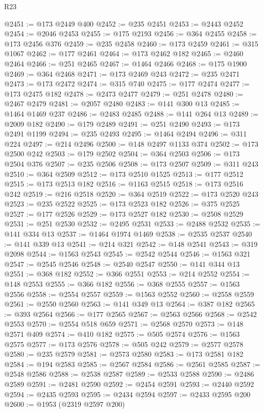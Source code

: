 \begin{lexlean}{R23}
\begin{coremodule}
@2451 := @173 @2449 @400
@2452 := @235 @2451
@2453 := @2443 @2452
@2454 := @2046 @2453
@2455 := @175 @2193
@2456 := @364 @2455
@2458 := @173 @2456 @376
@2459 := @235 @2458
@2460 := @173 @2459
@2461 := @315 @1067
@2462 := @177 @2461
@2464 := @173 @2462 @182
@2465 := @2460 @2464
@2466 := @251 @2465
@2467 := @1464 @2466
@2468 := @175 @1900
@2469 := @364 @2468
@2471 := @173 @2469 @243
@2472 := @235 @2471
@2473 := @173 @2472
@2474 := @315 @740
@2475 := @177 @2474
@2477 := @173 @2475 @182
@2478 := @2473 @2477
@2479 := @251 @2478
@2480 := @2467 @2479
@2481 := @2057 @2480
@2483 := @141 @300 @13
@2485 := @1464 @1469 @237
@2486 := @2483 @2485
@2488 := @141 @264 @13
@2489 := @2009 @182
@2490 := @179 @2489
@2491 := @251 @2490
@2493 := @173 @2491 @1199
@2494 := @235 @2493
@2495 := @1464 @2494
@2496 := @311 @224
@2497 := @214 @2496
@2500 := @148 @2497 @1133 @374
@2502 := @173 @2500 @242
@2503 := @179 @2502
@2504 := @364 @2503
@2506 := @173 @2504 @376
@2507 := @235 @2506
@2508 := @173 @2507
@2509 := @311 @243
@2510 := @364 @2509
@2512 := @173 @2510 @1525
@2513 := @177 @2512
@2515 := @173 @2513 @182
@2516 := @1163 @2515
@2518 := @173 @2516 @242
@2519 := @216 @2518
@2520 := @364 @2519
@2522 := @173 @2520 @243
@2523 := @235 @2522
@2525 := @173 @2523 @182
@2526 := @375 @2525
@2527 := @177 @2526
@2529 := @173 @2527 @182
@2530 := @2508 @2529
@2531 := @251 @2530
@2532 := @2495 @2531
@2533 := @2488 @2532
@2535 := @141 @334 @13
@2537 := @1464 @1974 @1469
@2538 := @2535 @2537
@2540 := @141 @339 @13
@2541 := @214 @321
@2542 := @148 @2541
@2543 := @319 @2098
@2544 := @1563 @2543
@2545 := @2542 @2544
@2546 := @1563 @321
@2547 := @2545 @2546
@2548 := @2540 @2547
@2550 := @141 @344 @13
@2551 := @368 @182
@2552 := @366 @2551
@2553 := @214 @2552
@2554 := @148 @2553
@2555 := @366 @182
@2556 := @368 @2555
@2557 := @1563 @2556
@2558 := @2554 @2557
@2559 := @1563 @2552
@2560 := @2558 @2559
@2561 := @2550 @2560
@2563 := @141 @349 @13
@2564 := @387 @182
@2565 := @393 @2564
@2566 := @177 @2565
@2567 := @2563 @2566
@2568 := @2542 @2553
@2570 := @2554 @518 @659
@2571 := @2568 @2570
@2573 := @148 @2571 @409
@2574 := @410 @182
@2575 := @505 @2574
@2576 := @1563 @2575
@2577 := @173 @2576
@2578 := @505 @242
@2579 := @2577 @2578
@2580 := @235 @2579
@2581 := @2573 @2580
@2583 := @173 @2581 @182
@2584 := @194 @2583
@2585 := @2567 @2584
@2586 := @2561 @2585
@2587 := @2548 @2586
@2588 := @2538 @2587
@2589 := @2533 @2588
@2590 := @2486 @2589
@2591 := @2481 @2590
@2592 := @2454 @2591
@2593 := @2440 @2592
@2594 := @2435 @2593
@2595 := @2434 @2594
@2597 := @2433 @2595 @200
@2600 := @1953 (@2319 @2597 @200)

\end{coremodule}
\end{lexlean}
